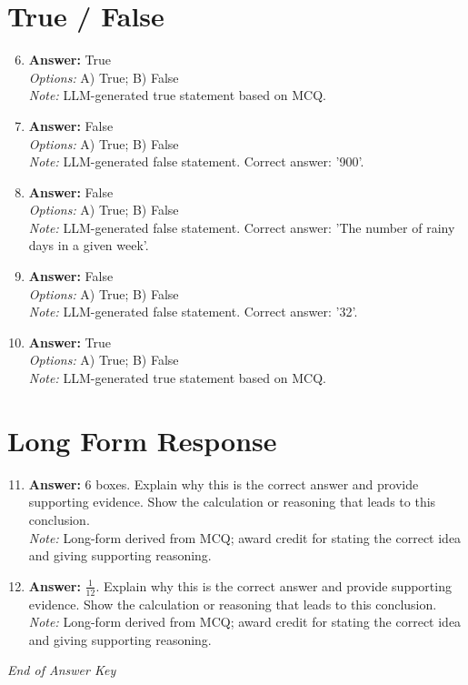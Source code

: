 \documentclass[12pt]{article}
\begin{document}
\section*{True / False}
\begin{enumerate}[label=\arabic*.]
\setcounter{enumi}{5}
\item \textbf{Answer:} True
\\ \textit{Options:} A) True; B) False
\\ \textit{Note:} LLM-generated true statement based on MCQ.
\item \textbf{Answer:} False
\\ \textit{Options:} A) True; B) False
\\ \textit{Note:} LLM-generated false statement. Correct answer: '900'.
\item \textbf{Answer:} False
\\ \textit{Options:} A) True; B) False
\\ \textit{Note:} LLM-generated false statement. Correct answer: 'The number of rainy days in a given week'.
\item \textbf{Answer:} False
\\ \textit{Options:} A) True; B) False
\\ \textit{Note:} LLM-generated false statement. Correct answer: '32'.
\item \textbf{Answer:} True
\\ \textit{Options:} A) True; B) False
\\ \textit{Note:} LLM-generated true statement based on MCQ.
\end{enumerate}

\section*{Long Form Response}
\begin{enumerate}[label=\arabic*.]
\setcounter{enumi}{10}
\item \textbf{Answer:} 6 boxes. Explain why this is the correct answer and provide supporting evidence. Show the calculation or reasoning that leads to this conclusion.
\\ \textit{Note:} Long-form derived from MCQ; award credit for stating the correct idea and giving supporting reasoning.
\item \textbf{Answer:} \ensuremath{\frac{1}{12}}. Explain why this is the correct answer and provide supporting evidence. Show the calculation or reasoning that leads to this conclusion.
\\ \textit{Note:} Long-form derived from MCQ; award credit for stating the correct idea and giving supporting reasoning.
\end{enumerate}

\vfill
\noindent\textit{End of Answer Key}
\end{document}
